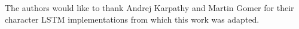 \documentclass[a4paper]{article}
\begin{document}
The authors would like to thank Andrej Karpathy and Martin Gomer for their character LSTM implementations from which this work was adapted.






\end{document}
